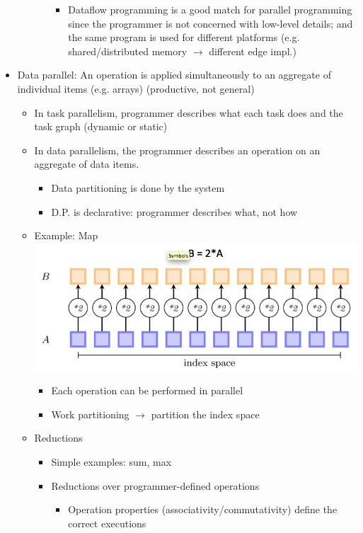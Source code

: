 \documentclass[a4paper]{article}
\begin{document}
\begin{itemize}
\begin{itemize}
\begin{itemize}
\begin{itemize}
\item Dataflow programming is a good match for parallel programming since the programmer is not concerned with low-level details; and the same program is used for different platforms (e.g. shared/distributed memory $\to$ different edge impl.)
\end{itemize}
\end{itemize}
\end{itemize}
\item Data parallel: An operation is applied simultaneously to an aggregate of individual items (e.g. arrays) (productive, not general)
\begin{itemize}
\item In task parallelism, programmer describes what each task does and the task graph (dynamic or static)
\item In data parallelism, the programmer describes an operation on an aggregate of data items. 
\begin{itemize}
\item Data partitioning is done by the system
\item D.P. is declarative: programmer describes what, not how
\end{itemize}
\item Example: Map\\\includegraphics[scale=0.42]{Figures/chapter4slide34.jpg}
\begin{itemize}
\item Each operation can be performed in parallel
\item Work partitioning $\to$ partition the index space
\end{itemize}
\item Reductions
\begin{itemize}
\item Simple examples: sum, max
\item Reductions over programmer-defined operations
\begin{itemize}
\item Operation properties (associativity/commutativity) define the correct executions

\end{itemize}
\end{itemize}
\end{itemize}
\end{itemize}
\end{document}
